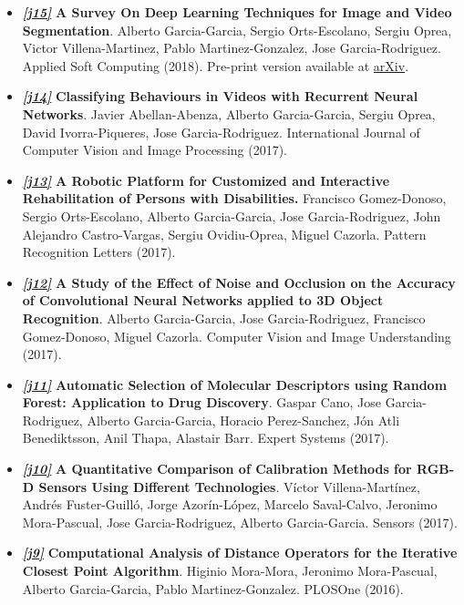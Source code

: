 \documentclass[8pt]{article}
\begin{document}
\begin{itemize}
    \item \emph{\textbf{\href{https://www.sciencedirect.com/science/article/pii/S1568494618302813}{[j15]}}} \textbf{A Survey On Deep Learning Techniques for Image and Video Segmentation}. Alberto Garcia-Garcia, Sergio Orts-Escolano, Sergiu Oprea, Victor Villena-Martinez, Pablo Martinez-Gonzalez, Jose Garcia-Rodriguez. Applied Soft Computing (2018). Pre-print version available at {\href{https://arxiv.org/abs/1704.06857}{arXiv}}.
    \item \emph{\textbf{\href{https://www.igi-global.com/article/classifying-behaviours-in-videos-with-recurrent-neural-networks/195006}{[j14]}}} \textbf{Classifying Behaviours in Videos with Recurrent Neural Networks}. Javier Abellan-Abenza, Alberto Garcia-Garcia, Sergiu Oprea, David Ivorra-Piqueres, Jose Garcia-Rodriguez. International Journal of Computer Vision and Image Processing (2017).
    \item \emph{\textbf{\href{http://www.sciencedirect.com/science/article/pii/S0167865517301903}{[j13]}}} \textbf{A Robotic Platform for Customized and Interactive Rehabilitation of Persons with Disabilities.} Francisco Gomez-Donoso, Sergio Orts-Escolano, Alberto Garcia-Garcia, Jose Garcia-Rodriguez, John Alejandro Castro-Vargas, Sergiu Ovidiu-Oprea, Miguel Cazorla. Pattern Recognition Letters (2017).
    \item \emph{\textbf{\href{http://www.sciencedirect.com/science/article/pii/S1077314217301182}{[j12]}}} \textbf{A Study of the Effect of Noise and Occlusion on the Accuracy of Convolutional Neural Networks applied to 3D Object Recognition}. Alberto Garcia-Garcia, Jose Garcia-Rodriguez, Francisco Gomez-Donoso, Miguel Cazorla. Computer Vision and Image Understanding (2017).
    \item \emph{\textbf{\href{http://www.sciencedirect.com/science/article/pii/S0957417416306819}{[j11]}}} \textbf{Automatic Selection of Molecular Descriptors using Random Forest: Application to Drug Discovery}. Gaspar Cano, Jose Garcia-Rodriguez, Alberto Garcia-Garcia, Horacio Perez-Sanchez, Jón Atli Benediktsson, Anil Thapa, Alastair Barr. Expert Systems (2017).
    \item \emph{\textbf{\href{http://www.mdpi.com/1424-8220/17/2/243/htm}{[j10]}}} \textbf{A Quantitative Comparison of Calibration Methods for RGB-D Sensors Using Different Technologies}. Víctor Villena-Martínez, Andrés Fuster-Guilló, Jorge Azorín-López, Marcelo Saval-Calvo, Jeronimo Mora-Pascual, Jose Garcia-Rodriguez, Alberto Garcia-Garcia. Sensors (2017).
    \item \emph{\textbf{\href{http://journals.plos.org/plosone/article?id=10.1371/journal.pone.0164694}{[j9]}}} \textbf{Computational Analysis of Distance Operators for the Iterative Closest Point Algorithm}. Higinio Mora-Mora, Jeronimo Mora-Pascual, Alberto Garcia-Garcia, Pablo Martinez-Gonzalez. PLOSOne (2016).

\end{itemize}
\end{document}

